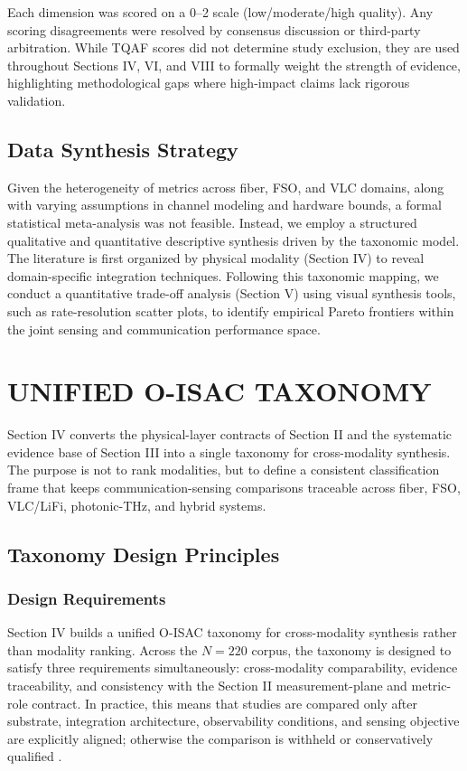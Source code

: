 \documentclass[letterpaper,journal]{IEEEtran}
\begin{document}
Each dimension was scored on a 0--2 scale (low/moderate/high quality). Any scoring disagreements were resolved by consensus discussion or third-party arbitration. While TQAF scores did not determine study exclusion, they are used throughout Sections IV, VI, and VIII to formally weight the strength of evidence, highlighting methodological gaps where high-impact claims lack rigorous validation.

\subsection{Data Synthesis Strategy}
Given the heterogeneity of metrics across fiber, FSO, and VLC domains, along with varying assumptions in channel modeling and hardware bounds, a formal statistical meta-analysis was not feasible. Instead, we employ a structured qualitative and quantitative descriptive synthesis driven by the taxonomic model. The literature is first organized by physical modality (Section IV) to reveal domain-specific integration techniques. Following this taxonomic mapping, we conduct a quantitative trade-off analysis (Section V) using visual synthesis tools, such as rate-resolution scatter plots, to identify empirical Pareto frontiers within the joint sensing and communication performance space.

\section{UNIFIED O-ISAC TAXONOMY}

Section IV converts the physical-layer contracts of Section II and the systematic evidence base of Section III into a single taxonomy for cross-modality synthesis. The purpose is not to rank modalities, but to define a consistent classification frame that keeps communication-sensing comparisons traceable across fiber, FSO, VLC/LiFi, photonic-THz, and hybrid systems.

\subsection{Taxonomy Design Principles}

\subsubsection{Design Requirements}
Section IV builds a unified O-ISAC taxonomy for cross-modality synthesis rather than modality ranking. Across the $N=220$ corpus, the taxonomy is designed to satisfy three requirements simultaneously: cross-modality comparability, evidence traceability, and consistency with the Section II measurement-plane and metric-role contract. In practice, this means that studies are compared only after substrate, integration architecture, observability conditions, and sensing objective are explicitly aligned; otherwise the comparison is withheld or conservatively qualified \cite{O_ISAC_006,O_ISAC_021,O_ISAC_068,O_ISAC_016}.
\end{document}
